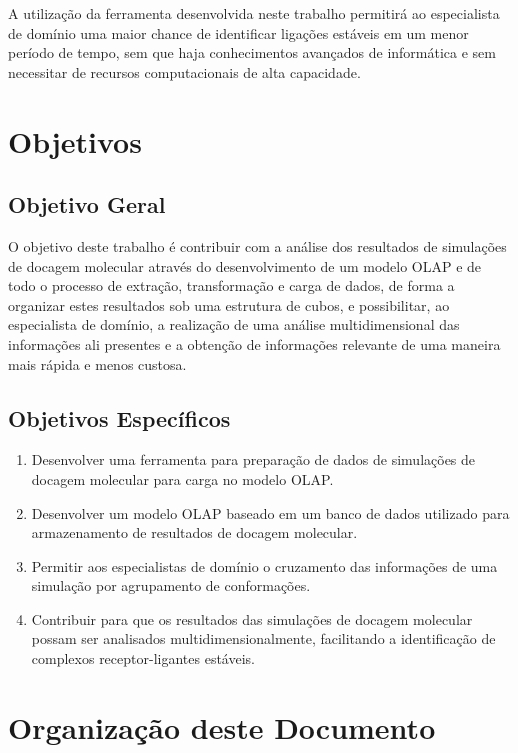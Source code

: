 A utilização da ferramenta desenvolvida neste trabalho permitirá ao especialista de domínio uma maior chance de identificar ligações estáveis em um menor período de tempo, sem que haja conhecimentos avançados de informática e sem necessitar de recursos computacionais de alta capacidade.

\section{Objetivos}
\subsection{Objetivo Geral}
O objetivo deste trabalho é contribuir com a análise dos resultados de simulações de docagem molecular através do desenvolvimento de um modelo OLAP e de todo o processo de extração, transformação e carga de dados, de forma a organizar estes resultados sob uma estrutura de cubos, e possibilitar, ao especialista de domínio, a realização de uma análise multidimensional das informações ali presentes e a obtenção de informações relevante de uma maneira mais rápida e menos custosa.

\subsection{Objetivos Específicos}
\begin{enumerate}
	\item Desenvolver uma ferramenta para preparação de dados de simulações de docagem molecular para carga no modelo OLAP.
	\item Desenvolver um modelo OLAP baseado em um banco de dados utilizado para armazenamento de resultados de docagem molecular.
	\item Permitir aos especialistas de domínio o cruzamento das informações de uma simulação por agrupamento de conformações.
	\item Contribuir para que os resultados das simulações de docagem molecular possam ser analisados multidimensionalmente, facilitando a identificação de complexos receptor-ligantes estáveis.
\end{enumerate}

\section{Organização deste Documento}